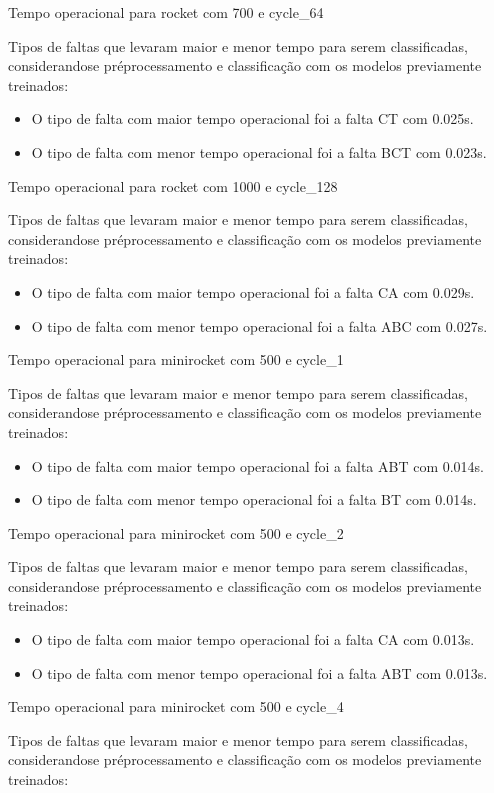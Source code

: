 Tempo operacional para rocket com 700 e cycle_64
\item Tipos de faltas que levaram maior e menor tempo para serem classificadas, considerando\hyph se pré\hyph processamento e classificação com os modelos previamente treinados:
\begin{itemize}
\item O tipo de falta com maior tempo operacional foi a falta CT com 0.025s.
\item O tipo de falta com menor tempo operacional foi a falta BCT com 0.023s.
\end{itemize}
Tempo operacional para rocket com 1000 e cycle_128
\item Tipos de faltas que levaram maior e menor tempo para serem classificadas, considerando\hyph se pré\hyph processamento e classificação com os modelos previamente treinados:
\begin{itemize}
\item O tipo de falta com maior tempo operacional foi a falta CA com 0.029s.
\item O tipo de falta com menor tempo operacional foi a falta ABC com 0.027s.
\end{itemize}
Tempo operacional para minirocket com 500 e cycle_1
\item Tipos de faltas que levaram maior e menor tempo para serem classificadas, considerando\hyph se pré\hyph processamento e classificação com os modelos previamente treinados:
\begin{itemize}
\item O tipo de falta com maior tempo operacional foi a falta ABT com 0.014s.
\item O tipo de falta com menor tempo operacional foi a falta BT com 0.014s.
\end{itemize}
Tempo operacional para minirocket com 500 e cycle_2
\item Tipos de faltas que levaram maior e menor tempo para serem classificadas, considerando\hyph se pré\hyph processamento e classificação com os modelos previamente treinados:
\begin{itemize}
\item O tipo de falta com maior tempo operacional foi a falta CA com 0.013s.
\item O tipo de falta com menor tempo operacional foi a falta ABT com 0.013s.
\end{itemize}
Tempo operacional para minirocket com 500 e cycle_4
\item Tipos de faltas que levaram maior e menor tempo para serem classificadas, considerando\hyph se pré\hyph processamento e classificação com os modelos previamente treinados:
